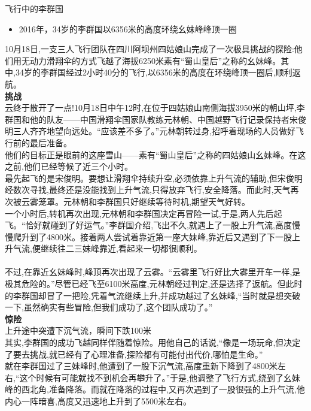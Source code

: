 飞行中的李群国\\

\begin{itemize}
\tightlist
\item
  2016年，34岁的李群国以6356米的高度环绕幺妹峰峰顶一圈\\
\end{itemize}

10月18日,一支三人飞行团队在四川阿坝州四姑娘山完成了一次极具挑战的探险:他们用无动力滑翔伞的方式飞越了海拔6250米素有``蜀山皇后''之称的幺妹峰。其中,34岁的李群国经过2小时40分的飞行,以6356米的高度在环绕峰顶一圈后,顺利返航。\\
\textbf{挑战}\\
云终于散开了一点!10月18日中午12时,在位于四姑娘山南侧海拔3950米的朝山坪,李群国和他的队友------中国滑翔伞国家队教练元林朝、中国越野飞行记录保持者宋俊明三人齐齐地望向远处。``应该差不多了。''元林朝转过身,招呼着现场的人员做好飞行前的最后准备。\\
他们的目标正是眼前的这座雪山------素有``蜀山皇后''之称的四姑娘山幺妹峰。在这之前,他们已经等候了近三个小时。\\
最先起飞的是宋俊明。要想让滑翔伞持续升空,必须依靠上升气流的辅助,但宋俊明经数次寻找,最终还是没能找到上升气流,只得放弃飞行,安全降落。而此时,天气再次被云雾笼罩。元林朝和李群国只好继续等待时机,期望天气好转。\\
一个小时后,转机再次出现,元林朝和李群国决定再冒险一试,于是,两人先后起飞。``恰好就碰到了好运气。''李群国介绍,飞出不久,就遇上了一股上升气流,高度慢慢爬升到了4800米。接着两人尝试着靠近第一座大妹峰,靠近后又遇到了下一股上升气流,便继续往二三妹峰靠近,看起来一切都很顺利。\\
~\\
不过,在靠近幺妹峰时,峰顶再次出现了云雾。``云雾里飞行好比大雾里开车一样,是极其危险的。''尽管已经飞至6100米高度,元林朝经过判定,还是选择了返航。但此时的李群国却冒了一把险,凭着气流继续上升,并成功越过了幺妹峰,``当时就是想突破一下,虽然确实有些冒险,但我们成功了,这个团队成功了。''\\
\textbf{惊险}\\
上升途中突遭下沉气流，瞬间下跌100米\\
其实,李群国的成功飞越同样伴随着惊险。用他自己的话说,``像是一场玩命,但决定了要去挑战,就已经有了心理准备,探险都有可能付出代价,哪怕是生命。''\\
就在李群国过了三妹峰时,他遭到了一股下沉气流,高度重新下降到了4800米左右,``这个时候有可能就找不到机会再攀升了。''于是,他调整了飞行方式,绕到了幺妹峰的西北角,准备降落。而就在降落的过程中,又再次遇到了一股很强的上升气流,他内心一阵暗喜,高度又迅速地上升到了5500米左右。\\
